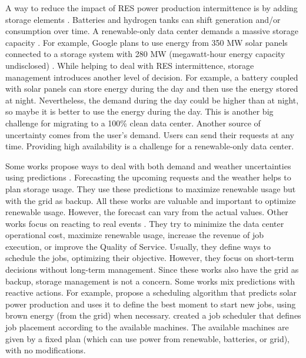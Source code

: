A way to reduce the impact of RES power production intermittence is by adding storage elements \cite{rostirolla2022survey}. Batteries and hydrogen tanks can shift generation and/or consumption over time. A renewable-only data center demands a massive storage capacity \cite{rostirolla2022survey}. For example, Google plans to use energy from 350 MW solar panels connected to a storage system with 280 MW (megawatt-hour energy capacity undisclosed) \cite{branscombe2020google}. While helping to deal with RES intermittence, storage management introduces another level of decision. For example, a battery coupled with solar panels can store energy during the day and then use the energy stored at night. Nevertheless, the demand during the day could be higher than at night, so maybe it is better to use the energy during the day. This is another big challenge for migrating to a 100\% clean data center. Another source of uncertainty comes from the user's demand. Users can send their requests at any time. Providing high availability is a challenge for a renewable-only data center.

Some works propose ways to deal with both demand and weather uncertainties using predictions \cite{wiesner2022cucumber, haddad2019mixed, lu_energy-efficient_2018, goiri2015matching}. Forecasting the upcoming requests and the weather helps to plan storage usage. They use these predictions to maximize renewable usage but with the grid as backup. All these works are valuable and important to optimize renewable usage. However, the forecast can vary from the actual values. Other works focus on reacting to real events \cite{liu2023online, he2022online, caux2019phase, sharma2011blink}. They try to minimize the data center operational cost, maximize renewable usage, increase the revenue of job execution, or improve the Quality of Service. Usually, they define ways to schedule the jobs, optimizing their objective. However, they focus on short-term decisions without long-term management. Since these works also have the grid as backup, storage management is not a concern. Some works mix predictions with reactive actions. For example, \citeauthor{goiri2015matching} \cite{goiri2015matching} propose a scheduling algorithm that predicts solar power production and uses it to define the best moment to start new jobs, using brown energy (from the grid) when necessary. \citeauthor{venkataswamy2023rare} \cite{venkataswamy2023rare} created a job scheduler that defines job placement according to the available machines. The available machines are given by a fixed plan (which can use power from renewable, batteries, or grid), with no modifications.

